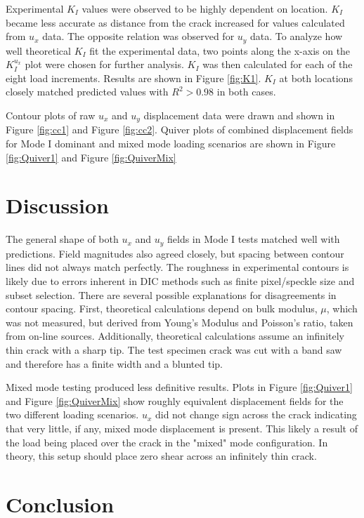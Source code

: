 \documentclass[12pt]{article}
\begin{document}
Experimental $K_I$ values were observed to be highly dependent on location. $K_I$ became less accurate as distance from the crack increased for values calculated from $u_x$ data. The opposite relation was observed for $u_y$ data. To analyze how well theoretical $K_I$ fit the experimental data, two points along the x-axis on the $K_I^{u_x}$ plot were chosen for further analysis. $K_I$ was then calculated for each of the eight load increments. Results are shown in Figure \ref{fig:K1}. $K_I$ at both locations closely matched predicted values with $R^2>0.98$ in both cases. 


Contour plots of raw $u_x$ and $u_y$ displacement data were drawn and shown in Figure \ref{fig:cc1} and Figure \ref{fig:cc2}. Quiver plots of combined displacement fields for Mode I dominant and mixed mode loading scenarios are shown in Figure \ref{fig:Quiver1} and Figure \ref{fig:QuiverMix}



\section{Discussion}%
The general shape of both $u_x$ and $u_y$ fields in Mode I tests matched well with predictions. Field magnitudes also agreed closely, but spacing between contour lines did not always match perfectly. The roughness in experimental contours is likely due to errors inherent in DIC methods such as finite pixel/speckle size and subset selection. There are several possible explanations for disagreements in contour spacing. First, theoretical calculations depend on bulk modulus, $\mu$, which was not measured, but derived from Young's Modulus and Poisson's ratio, taken from on-line sources. Additionally, theoretical calculations assume an infinitely thin crack with a sharp tip. The test specimen crack was cut with a band saw and therefore has a finite width and a blunted tip. 

Mixed mode testing produced less definitive results. Plots in  Figure \ref{fig:Quiver1} and Figure \ref{fig:QuiverMix} show roughly equivalent displacement fields for the two different loading scenarios. $u_x$ did not change sign across the crack indicating that very little, if any, mixed mode displacement is present. This likely a result of the load being placed over the crack in the "mixed" mode configuration. In theory, this setup should place zero shear across an infinitely thin crack.  


\section{Conclusion}%
\end{document}
